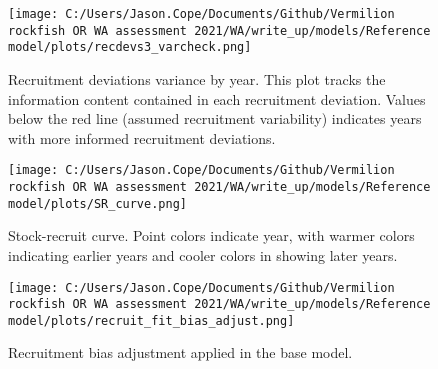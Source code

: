 \documentclass[11pt,
  english,
  a4paper,
]{article}
\begin{document}
\tagmcend\tagstructend


\begin{figure}
\centering
\texttt{[image: C:/Users/Jason.Cope/Documents/Github/Vermilion rockfish OR WA assessment 2021/WA/write\_up/models/Reference model/plots/recdevs3\_varcheck.png]}
\caption{Recruitment deviations variance by year. This plot tracks the information content contained in each recruitment deviation. Values below the red line (assumed recruitment variability) indicates years with more informed recruitment deviations.\label{fig:rec-devs-sigmas}}
\end{figure}

\tagmcend\tagstructend


\begin{figure}
\centering
\texttt{[image: C:/Users/Jason.Cope/Documents/Github/Vermilion rockfish OR WA assessment 2021/WA/write\_up/models/Reference model/plots/SR\_curve.png]}
\caption{Stock-recruit curve. Point colors indicate year, with warmer colors indicating earlier years and cooler colors in showing later years.\label{fig:bh-curve}}
\end{figure}

\tagmcend\tagstructend


\begin{figure}
\centering
\texttt{[image: C:/Users/Jason.Cope/Documents/Github/Vermilion rockfish OR WA assessment 2021/WA/write\_up/models/Reference model/plots/recruit\_fit\_bias\_adjust.png]}
\caption{Recruitment bias adjustment applied in the base model.\label{fig:bias-adj}}
\end{figure}

\tagmcend\tagstructend

\end{document}
